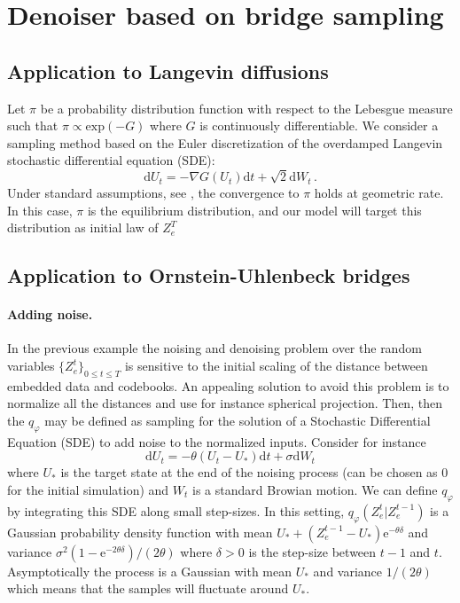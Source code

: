 \documentclass{article}
\begin{document}
\section{Denoiser based on bridge sampling}

\subsection{Application to Langevin diffusions}
Let $\pi$ be a probability distribution function with respect to the Lebesgue measure such that $\pi \propto \mathrm{exp}(-G)$ where $G$ is continuously differentiable.
We consider a sampling method based on the Euler discretization of the overdamped Langevin
stochastic differential equation (SDE):
$$
\mathrm{d}U_t = -\nabla G(U_t)\mathrm{d}t + \sqrt{2}\mathrm{d}W_t\,.
$$
Under standard assumptions, see \cite{}, the convergence to $\pi$ holds at geometric rate. In this case, $\pi$ is the equilibrium distribution, and our model will target this distribution as initial law of $Z_e^T$

\subsection{Application to Ornstein-Uhlenbeck bridges}
\paragraph{Adding noise. }
In the previous example the noising and denoising problem over the random variables $\{Z_e^t\}_{0\leqslant t\leqslant T}$ is sensitive to the initial scaling of the distance between embedded data and codebooks. An appealing solution to avoid this problem is to normalize all the distances and use for instance spherical projection. Then, then the $q_\varphi$ may  be defined as sampling for the solution of a Stochastic Differential Equation (SDE) to add noise to the  normalized inputs. Consider for instance
$$
\mathrm{d}U_t = -\theta (U_t - U_*)\mathrm{d}t + \sigma\mathrm{d}W_t
$$
where $U_*$ is the target state at the end of the noising process (can be chosen as 0 for the initial simulation) and $W_t$ is a standard Browian motion. We can define $q_\varphi$ by integrating this SDE along small step-sizes. In this setting, $q_\varphi(Z_e^{t}|Z_e^{t-1})$ is a Gaussian probability density function with mean $U_* + (Z_e^{t-1}-U_*)\mathrm{e}^{-\theta \delta}$ and variance $\sigma^2(1-\mathrm{e}^{-2\theta\delta})/(2\theta)$ where $\delta>0$ is the step-size between $t-1$ and $t$. Asymptotically the process is a Gaussian with mean $U_*$ and variance $1/(2\theta)$ which means that the samples will fluctuate around $U_*$.
\end{document}

